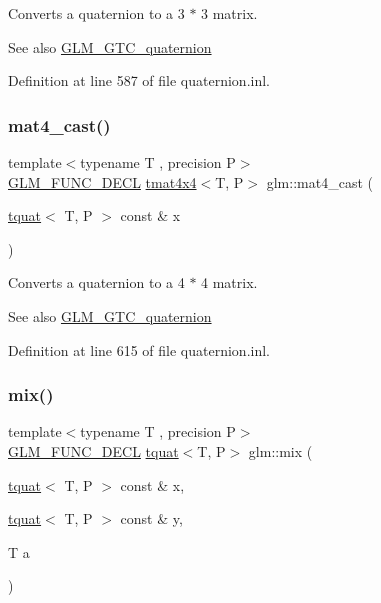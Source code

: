 Converts a quaternion to a 3 $\ast$ 3 matrix.

\begin{DoxySeeAlso}{See also}
\mbox{\hyperlink{group__gtc__quaternion}{G\+L\+M\+\_\+\+G\+T\+C\+\_\+quaternion}} 
\end{DoxySeeAlso}


Definition at line 587 of file quaternion.\+inl.

\mbox{\label{group__gtc__quaternion_ga14bb2ddf028c91542763eb6f2bba47ef}} 
\subsubsection{\texorpdfstring{mat4\_cast()}{mat4\_cast()}}
{\footnotesize\ttfamily template$<$typename T , precision P$>$ \\
\mbox{\hyperlink{setup_8hpp_ab2d052de21a70539923e9bcbf6e83a51}{G\+L\+M\+\_\+\+F\+U\+N\+C\+\_\+\+D\+E\+CL}} \mbox{\hyperlink{structglm_1_1tmat4x4}{tmat4x4}}$<$T, P$>$ glm\+::mat4\+\_\+cast (\begin{DoxyParamCaption}\item[{\mbox{\hyperlink{structglm_1_1tquat}{tquat}}$<$ T, P $>$ const \&}]{x }\end{DoxyParamCaption})}

Converts a quaternion to a 4 $\ast$ 4 matrix.

\begin{DoxySeeAlso}{See also}
\mbox{\hyperlink{group__gtc__quaternion}{G\+L\+M\+\_\+\+G\+T\+C\+\_\+quaternion}} 
\end{DoxySeeAlso}


Definition at line 615 of file quaternion.\+inl.

\mbox{\label{group__gtc__quaternion_ga31cc82178742c36450f5662bd4fb30b0}} 
\subsubsection{\texorpdfstring{mix()}{mix()}}
{\footnotesize\ttfamily template$<$typename T , precision P$>$ \\
\mbox{\hyperlink{setup_8hpp_ab2d052de21a70539923e9bcbf6e83a51}{G\+L\+M\+\_\+\+F\+U\+N\+C\+\_\+\+D\+E\+CL}} \mbox{\hyperlink{structglm_1_1tquat}{tquat}}$<$T, P$>$ glm\+::mix (\begin{DoxyParamCaption}\item[{\mbox{\hyperlink{structglm_1_1tquat}{tquat}}$<$ T, P $>$ const \&}]{x,  }\item[{\mbox{\hyperlink{structglm_1_1tquat}{tquat}}$<$ T, P $>$ const \&}]{y,  }\item[{T}]{a }\end{DoxyParamCaption})}

